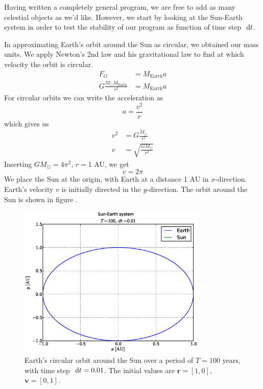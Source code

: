 
Having written a completely general program, we are free to add as many
celestial objects as we'd like. However, we start by looking at the Sun-Earth
system in order to test the stability of our program as function of time step
$\ \mathrm{d}t$.

In approximating Earth's orbit around the Sun as circular, we obtained our
mass units. We apply Newton's 2nd law and his gravitational law to find at which
velocity the orbit is circular.
%
\begin{align*}
	F_G &= M_{\text{Earth}}a \\
	G \frac{M_{\odot}M_{\text{Earth}}}{r^2} &= M_{\text{Earth}}a
\end{align*}
%
For circular orbits we can write the acceleration as
%
\begin{equation*}
	a = \frac{v^2}{r}
\end{equation*}
which gives us
%
\begin{align*}
	v^2 &= G \frac{M_{\odot}}{r^2} \\
	v &= \sqrt{ \frac{GM_{\odot}}{r^2}}
\end{align*}
%
Inserting $GM_{\odot} = 4\pi^2$, $r = 1$ AU, we get
%
\begin{equation*}
	v = 2\pi
\end{equation*}
%
We place the Sun at the origin, with Earth at a distance 1 AU in $x$-direction.
Earth's velocity $v$ is initially directed in the $y$-direction. The orbit
around the Sun is shown in figure .
%
\begin{figure}[htpb]
	\centering
	\includegraphics[width=0.8\textwidth]{figures/sun_earth_T100_dt1e-2}
	\caption{Earth's circular orbit around the Sun over a period of $T = 100$
	 years, with time step $\ \mathrm{d}t = 0.01$. The initial values are
	 $\mathbf{r} = [1,0]$, $\mathbf{v} = [0,1]$.}
	\label{fig:sunEarth-dt0.01}
\end{figure}
